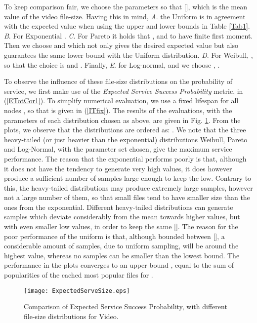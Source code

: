 \documentclass[conference]{IEEEtran}
\begin{document}
{To keep comparison fair, we choose the parameters so that  [], which is the mean value of the video file-size. Having this in mind, \textit{A}. the Uniform is in agreement with the expected value when using the upper and lower bounds in Table \ref{Tab1}. \textit{B}. For Exponential . \textit{C}. For Pareto it holds that , and  to have finite first moment. Then we choose  and  which not only gives the desired expected value but also guarantees the same lower bound   with the Uniform distribution. \textit{D}. For Weibull, , so that the choice is  and . Finally, \textit{E}. for Log-normal,  and we choose , .

To observe the influence of these file-size distributions on the probability of service, we first make use of the \textit{Expected Service Success Probability} metric, in (\ref{ETotCor1}). To simplify numerical evaluation, we use a fixed lifespan for all nodes  , so that  is given in (\ref{ITfix}). The results of the evaluations, with the parameters of each distribution chosen as above, are given in Fig. \ref{fig:Expdistvar}. From the plots, we observe that the distributions are ordered as: . We note that the three heavy-tailed (or just heavier than the exponential) distributions Weibull, Pareto and Log-Normal, with the parameter set chosen, give the maximum service performance. The reason that the exponential performs poorly is that, although it does not have the tendency to generate very high values, it does however produce a sufficient number of samples large enough to keep the  low. Contrary to this, the heavy-tailed distributions may produce extremely large samples, however not a large number of them, so that small files tend to have smaller size than the ones from the exponential. Different heavy-tailed distributions can generate samples which deviate considerably from the mean towards higher values, but with even smaller low values, in order to keep the same  []. The reason for the poor performance of the uniform is that, although bounded between  [], a considerable amount of samples, due to uniform sampling, will be around the highest value, whereas no samples can be smaller than the lowest bound. The performance in the plots converges to an upper bound , equal to the sum of popularities of the  cached most popular files  for .


\begin{figure}[ht!]
\centering
\texttt{[image: ExpectedServeSize.eps]}
\caption{Comparison of Expected Service Success Probability, with different file-size distributions 
for Video.}
\label{fig:Expdistvar}
\end{figure}

}
\end{document}
